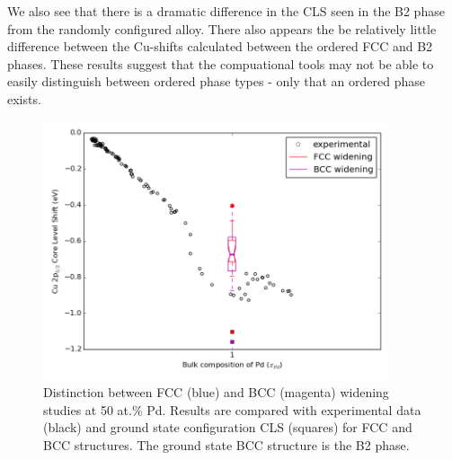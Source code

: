 \documentclass[number, sort&compress, review, 12pt]{elsarticle}
\begin{document}
We also see that there is a dramatic difference in the CLS seen in the B2 phase from the randomly configured alloy. There also appears the be relatively little difference between the Cu-shifts calculated between the ordered FCC and B2 phases. These results suggest that the compuational tools may not be able to easily distinguish between ordered phase types - only that an ordered phase exists.

\begin{figure}[H]
\centering
\includegraphics[width=4in]{./images/wid-compare.png}
\caption{\label{fig-wid-compare}Distinction between FCC (blue) and BCC (magenta) widening studies at 50 at.\% Pd. Results are compared with experimental data (black) and ground state configuration CLS (squares) for FCC and BCC structures. The ground state BCC structure is the B2 phase.}
\end{figure}
\end{document}
